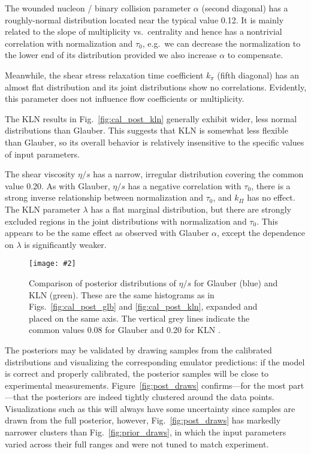\documentclass[aps,prc,reprint,superscriptaddress,amsmath]{revtex4-1}
\newcommand{\colfig}[3][t]{
  \begin{figure}[#1]
    \texttt{[image: \#2]}
    \caption{\label{fig:#2}#3}
  \end{figure}
}
\begin{document}
The wounded nucleon / binary collision parameter $\alpha$ (second diagonal) has a roughly-normal distribution located near the typical value 0.12.
It is mainly related to the slope of multiplicity vs.\ centrality and hence has a nontrivial correlation with normalization and $\tau_0$, e.g.\ we can decrease the normalization to the lower end of its distribution provided we also increase $\alpha$ to compensate.

Meanwhile, the shear stress relaxation time coefficient $k_\pi$ (fifth diagonal) has an almost flat distribution and its joint distributions show no correlations.
Evidently, this parameter does not influence flow coefficients or multiplicity.

The KLN results in Fig.~\ref{fig:cal_post_kln} generally exhibit wider, less normal distributions than Glauber.
This suggests that KLN is somewhat less flexible than Glauber, so its overall behavior is relatively insensitive to the specific values of input parameters.

The shear viscosity $\eta/s$ has a narrow, irregular distribution covering the common value 0.20.
As with Glauber, $\eta/s$ has a negative correlation with $\tau_0$, there is a strong inverse relationship between normalization and $\tau_0$, and $k_\Pi$ has no effect.
The KLN parameter $\lambda$ has a flat marginal distribution, but there are strongly excluded regions in the joint distributions with normalization and $\tau_0$.
This appears to be the same effect as observed with Glauber $\alpha$, except the dependence on $\lambda$ is significantly weaker.

\colfig[b]{post_compare}{
  Comparison of posterior distributions of $\eta/s$ for Glauber (blue) and KLN (green).
  These are the same histograms as in Figs.~\ref{fig:cal_post_glb} and \ref{fig:cal_post_kln}, expanded and placed on the same axis.
  The vertical grey lines indicate the common values 0.08 for Glauber and 0.20 for KLN \cite{Shen:2011zc,Heinz:2011kt}.
}

The posteriors may be validated by drawing samples from the calibrated distributions and visualizing the corresponding emulator predictions:
if the model is correct and properly calibrated, the posterior samples will be close to experimental measurements.
Figure~\ref{fig:post_draws} confirms---for the most part---that the posteriors are indeed tightly clustered around the data points.
Visualizations such as this will always have some uncertainty since samples are drawn from the full posterior, however, Fig.~\ref{fig:post_draws} has markedly narrower clusters than Fig.~\ref{fig:prior_draws}, in which the input parameters varied across their full ranges and were not tuned to match experiment.
\end{document}
